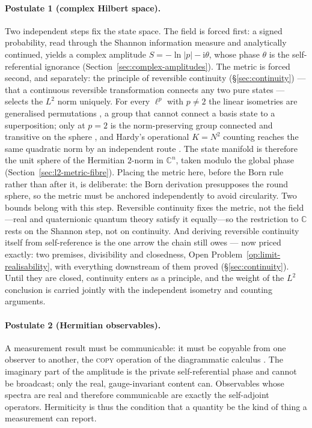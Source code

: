\paragraph{Postulate 1 (complex Hilbert space).}
Two independent steps fix the state space. The field is forced first: a signed
probability, read through the Shannon information measure and analytically
continued, yields a complex amplitude $S=-\ln\lvert p\rvert-\mathrm{i}\theta$,
whose phase $\theta$ is the self-referential ignorance
(Section~\ref{sec:complex-amplitudes}). The metric is forced second, and
separately: the principle of reversible continuity (\S\ref{sec:continuity}) --- that a continuous
reversible transformation connects any two pure states --- selects the $L^{2}$ norm uniquely.
For every $\ell^{p}$ with $p\neq 2$ the linear isometries are generalised
permutations \autocite{Banach1932, Lamperti1958}, a group that cannot connect a
basis state to a superposition; only at $p=2$ is the norm-preserving group
connected and transitive on the sphere \autocite{Aaronson2004h}, and Hardy's
operational $K=N^{2}$ counting reaches the same quadratic norm by an independent
route \autocite{Hardy2001a}. The state manifold is therefore the unit sphere of the
Hermitian $2$-norm in $\mathbb{C}^{n}$, taken modulo the global phase
(Section~\ref{sec:l2-metric-fibre}). Placing the metric here, before the Born
rule rather than after it, is deliberate: the Born derivation presupposes the
round sphere, so the metric must be anchored independently to avoid circularity.
Two bounds belong with this step. Reversible continuity fixes the metric, not the
field---real and quaternionic quantum theory satisfy it equally---so the
restriction to $\mathbb{C}$ rests on the Shannon step, not on continuity. And
deriving reversible continuity itself from self-reference is the one arrow the chain still owes
--- now priced exactly: two premises, divisibility and closedness,
Open Problem~\ref{op:limit-realisability}, with everything downstream of them proved
(\S\ref{sec:continuity}). Until they are closed, continuity enters as a principle, and the weight
of the $L^{2}$ conclusion is carried jointly with the independent isometry and counting arguments.

\paragraph{Postulate 2 (Hermitian observables).}
A measurement result must be communicable: it must be copyable from one observer
to another, the \textsc{copy} operation of the diagrammatic calculus
\autocite{CoeckeKissinger2017}. The imaginary part of the amplitude is the
private self-referential phase and cannot be broadcast; only the real,
gauge-invariant content can. Observables whose spectra are real and therefore
communicable are exactly the self-adjoint operators. Hermiticity is thus the
condition that a quantity be the kind of thing a measurement can report.

